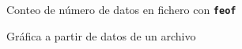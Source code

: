\documentclass[8pt]{extarticle}
\newcommand{\cmdo}[1]{\texttt{\small\bfseries#1}} %
\begin{document}
\begin{multicols}{3}
        \begin{exampleBlock}{Conteo de n\'umero de datos en fichero con \cmdo{feof}}
        \end{exampleBlock}
        
        \begin{exampleBlock}{Gr\'afica a partir de datos de un archivo}
        \end{exampleBlock}

    \end{multicols}


    \newpage


    \vspace*{0.5cm}
\end{document}
